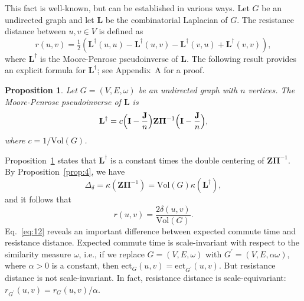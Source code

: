 \documentclass[10pt,twocolumn]{article}
\newtheorem{proposition}[theorem]{Proposition}
\numberwithin{equation}{section}
\begin{document}
This fact is well-known, but can be established in various ways.
Let $G$
be an undirected graph and let $\mathbf{L}$ be the combinatorial
Laplacian of $G$. The resistance distance between $u, v \in
V$ is defined as
\begin{equation*}
  r(u,v) = \tfrac{1}{2}(\mathbf{L}^{\dagger}(u,u) - 
\mathbf{L}^{\dagger}(u,v) -
  \mathbf{L}^{\dagger}(v,u) + \mathbf{L}^{\dagger}(v,v)),
\end{equation*}
where $\mathbf{L}^{\dagger}$ is the Moore-Penrose
pseudoinverse of $\mathbf{L}$. 
The following result provides an explicit formula for
$\mathbf{L}^{\dagger}$; see Appendix~A for a proof.
\begin{proposition}
  \label{prop:5}
  Let $G = (V,E,\omega)$ be an undirected graph with $n$ vertices. The
  Moore-Penrose pseudoinverse of $\mathbf{L}$ is
  \begin{equation}
    \label{eq:13}
    \mathbf{L}^{\dagger} = c \Bigl(\mathbf{I} - 
\frac{\mathbf{J}}{n}\Bigr) \mathbf{Z}
    \bm{\Pi}^{-1} \Bigl(\mathbf{I} - \frac{\mathbf{J}}{n}\Bigr),
  \end{equation}
  where $c = 1/\mathrm{Vol}(G)$. 
\end{proposition}
\noindent
Proposition~\ref{prop:5} states that
$\mathbf{L}^{\dagger}$ is a constant times the double centering of
$\mathbf{Z}\bm{\Pi}^{-1}$. By Proposition~\ref{prop:4}, we have 
\begin{equation}
  \label{eq:42}
 \Delta_{\delta} = \kappa(\mathbf{Z}\bm{\Pi}^{-1}) = \mathrm{Vol}(G)
\kappa(\mathbf{L}^{\dagger}),
\end{equation}
and it follows that
\begin{equation}
  \label{eq:12}
  r(u,v) = \frac{2 \delta(u,v)}{\mathrm{Vol}(G)}.
\end{equation}
\noindent
Eq.~\eqref{eq:12} reveals an important difference between
expected commute time and resistance distance. Expected commute time
is scale-invariant with respect to the similarity measure $\omega$,
i.e., if we replace $G = (V,E,\omega)$ with 
$G^\prime = (V,E, \alpha \omega)$, where
$\alpha > 0$ is a constant, then
$\mbox{ect}_{G}(u,v) = \mbox{ect}_{G^\prime}(u,v)$. 
But resistance distance is not scale-invariant.
In fact, resistance distance is scale-equivariant:
$r_{G^\prime}(u,v) = r_{G}(u,v)/\alpha$. 
\end{document}

